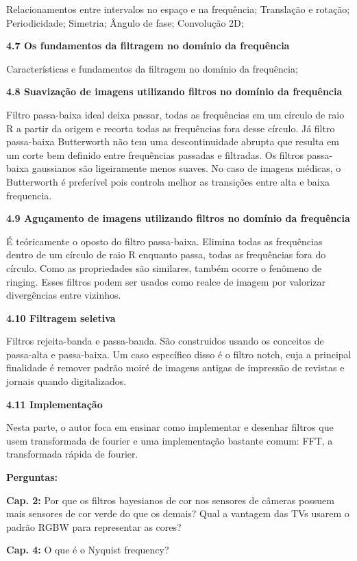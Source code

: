 \documentclass[a4paper]{sbgames}               %
\begin{document}
Relacionamentos entre intervalos no espaço e na frequência; Translação e rotação; Periodicidade; Simetria; Ângulo de fase; Convolução 2D;

\textbf{4.7 Os fundamentos da filtragem no domínio da frequência}

Características e fundamentos da filtragem no domínio da frequência;

\textbf{4.8 Suavização de imagens utilizando filtros no domínio da frequência}

Filtro passa-baixa ideal deixa passar, todas as frequências em um círculo de raio R a partir da origem e recorta todas as frequências fora desse círculo. Já filtro passa-baixa Butterworth não tem uma descontinuidade abrupta que resulta em um corte bem definido entre frequências passadas e filtradas. Os filtros passa-baixa gaussianos são ligeiramente menos suaves. No caso de imagens médicas, o Butterworth é preferível pois controla melhor as transições entre alta e baixa frequencia.

\textbf{4.9 Aguçamento de imagens utilizando filtros no domínio da frequência}

É teóricamente o oposto do filtro passa-baixa. Elimina todas as frequências dentro de um círculo de raio R enquanto passa, todas as frequências fora do círculo. Como as propriedades são similares, também ocorre o fenômeno de ringing. Esses filtros podem ser usados como realce de imagem por valorizar divergências entre vizinhos. 

\textbf{4.10 Filtragem seletiva}

Filtros rejeita-banda e passa-banda. São construidos usando os conceitos de passa-alta e passa-baixa. Um caso específico disso é o filtro notch, cuja a principal finalidade é remover padrão moiré de imagens antigas de impressão de revistas e jornais quando digitalizados.

\textbf{4.11 Implementação}

Nesta parte, o autor foca em ensinar como implementar e desenhar filtros que usem transformada de fourier e uma implementação bastante comum: FFT, a transformada rápida de fourier.

\pagebreak
\onecolumn
\textbf{Perguntas:}

\textbf{Cap. 2:} Por que os filtros bayesianos de cor nos sensores de câmeras possuem mais sensores de cor verde do que os demais? Qual a vantagem das TVs usarem o padrão RGBW para representar as cores? \cite{li2015design}

\textbf{Cap. 4:} O que é o Nyquist frequency? \cite{tang2016design}



\end{document}
